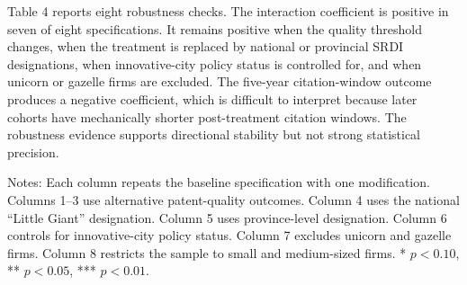 \documentclass[12pt]{article}
\begin{document}
Table 4 reports eight robustness checks. The interaction coefficient is positive in seven of eight specifications. It remains positive when the quality threshold changes, when the treatment is replaced by national or provincial SRDI designations, when innovative-city policy status is controlled for, and when unicorn or gazelle firms are excluded. The five-year citation-window outcome produces a negative coefficient, which is difficult to interpret because later cohorts have mechanically shorter post-treatment citation windows. The robustness evidence supports directional stability but not strong statistical precision.

\begin{table}[htbp]
\centering
\caption{Robustness checks}
\begin{minipage}{0.96\textwidth}
\footnotesize Notes: Each column repeats the baseline specification with one modification. Columns 1--3 use alternative patent-quality outcomes. Column 4 uses the national ``Little Giant'' designation. Column 5 uses province-level designation. Column 6 controls for innovative-city policy status. Column 7 excludes unicorn and gazelle firms. Column 8 restricts the sample to small and medium-sized firms. * \(p<0.10\), ** \(p<0.05\), *** \(p<0.01\).
\end{minipage}
\end{table}
\end{document}
